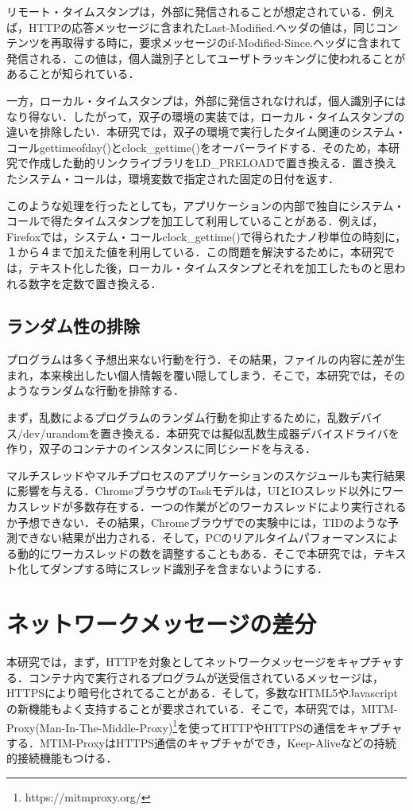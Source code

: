 \documentclass[submit]{ipsj}
\begin{document}
リモート・タイムスタンプは，外部に発信されることが想定されている．例えば，HTTPの応答メッセージに含まれたLast-Modified.ヘッダの値は，同じコンテンツを再取得する時に，要求メッセージのif-Modified-Since.ヘッダに含まれて発信される．この値は，個人識別子としてユーザトラッキングに使われることがあることが知られている．

一方，ローカル・タイムスタンプは，外部に発信されなければ，個人識別子にはなり得ない．したがって，双子の環境の実装では，ローカル・タイムスタンプの違いを排除したい．本研究では，双子の環境で実行したタイム関連のシステム・コールgettimeofday()とclock\_gettime()をオーバーライドする．そのため，本研究で作成した動的リンクライブラリをLD\_PRELOADで置き換える．置き換えたシステム・コールは，環境変数で指定された固定の日付を返す．


このような処理を行ったとしても，アプリケーションの内部で独自にシステム・コールで得たタイムスタンプを加工して利用していることがある．例えば，Firefoxでは，システム・コールclock\_gettime()で得られたナノ秒単位の時刻に，１から４まで加えた値を利用している．この問題を解決するために，本研究では，テキスト化した後，ローカル・タイムスタンプとそれを加工したものと思われる数字を定数で置き換える．

\subsection{ランダム性の排除}

プログラムは多く予想出来ない行動を行う．その結果，ファイルの内容に差が生まれ，本来検出したい個人情報を覆い隠してしまう．そこで，本研究では，そのようなランダムな行動を排除する．

まず，乱数によるプログラムのランダム行動を抑止するために，乱数デバイス/dev/urandomを置き換える．本研究では擬似乱数生成器デバイスドライバを作り，双子のコンテナのインスタンスに同じシードを与える．

マルチスレッドやマルチプロセスのアプリケーションのスケジュールも実行結果に影響を与える．ChromeブラウザのTaskモデルは，UIとIOスレッド以外にワーカスレッドが多数存在する．一つの作業がどのワーカスレッドにより実行されるか予想できない．その結果，Chromeブラウザでの実験中には，TIDのような予測できない結果が出力される．そして，PCのリアルタイムパフォーマンスによる動的にワーカスレッドの数を調整することもある\cite{dynamic}．そこで本研究では，テキスト化してダンプする時にスレッド識別子を含まないようにする．

\section{ネットワークメッセージの差分}
\label{sec:net}
本研究では，まず，HTTPを対象としてネットワークメッセージをキャプチャする．コンテナ内で実行されるプログラムが送受信されているメッセージは，HTTPSにより暗号化されてることがある．そして，多数なHTML5やJavascriptの新機能もよく支持することが要求されている．そこで，本研究では，MITM-Proxy(Man-In-The-Middle-Proxy)\footnote{https://mitmproxy.org/}を使ってHTTPやHTTPSの通信をキャプチャする．MTIM-ProxyはHTTPS通信のキャプチャができ，Keep-Aliveなどの持続的接続機能もつける．
\end{document}
